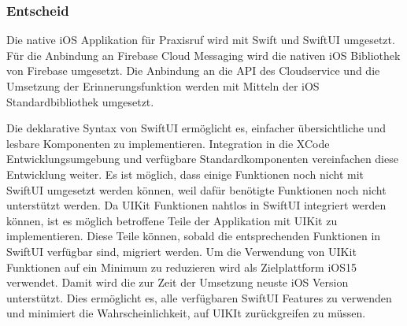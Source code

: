 \clearpage

\subsubsection{Entscheid}

Die native iOS Applikation für Praxisruf wird mit Swift und SwiftUI umgesetzt.
Für die Anbindung an Firebase Cloud Messaging wird die nativen iOS Bibliothek von Firebase umgesetzt.
Die Anbindung an die API des Cloudservice und die Umsetzung der Erinnerungsfunktion werden mit Mitteln der iOS Standardbibliothek umgesetzt.

Die deklarative Syntax von SwiftUI ermöglicht es, einfacher übersichtliche und lesbare Komponenten zu implementieren.
Integration in die XCode Entwicklungsumgebung und verfügbare Standardkomponenten vereinfachen diese Entwicklung weiter.
Es ist möglich, dass einige Funktionen noch nicht mit SwiftUI umgesetzt werden können, weil dafür benötigte Funktionen noch nicht unterstützt werden.
Da UIKit Funktionen nahtlos in SwiftUI integriert werden können, ist es möglich betroffene Teile der Applikation mit UIKit zu implementieren.
Diese Teile können, sobald die entsprechenden Funktionen in SwiftUI verfügbar sind, migriert werden.
Um die Verwendung von UIKit Funktionen auf ein Minimum zu reduzieren wird als Zielplattform iOS15 verwendet.
Damit wird die zur Zeit der Umsetzung neuste iOS Version unterstützt.
Dies ermöglicht es, alle verfügbaren SwiftUI Features zu verwenden und minimiert die Wahrscheinlichkeit, auf UIKIt zurückgreifen zu müssen.

\clearpage
